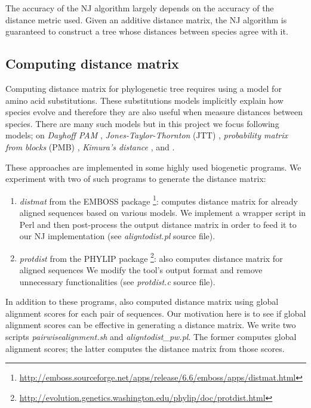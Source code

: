 \documentclass[11pt,letterpaper]{article}
\theoremstyle{definition}
\begin{document}
The accuracy of the NJ algorithm largely depends on the accuracy of the distance metric used. Given an additive distance matrix, the NJ algorithm is guaranteed to construct a tree whose distances between species agree with it. 

\subsection{Computing distance matrix}\label{distance}


Computing distance matrix for phylogenetic tree requires using a model for amino acid substitutions. These substitutions models implicitly explain how species evolve and therefore they are also useful when measure distances between species. There are many such models but in this project we focus following models; on \textit{Dayhoff PAM} \cite{kosiol2005different}, \textit{Jones-Taylor-Thornton} (JTT) \cite{jones1992rapid}, \textit{probability matrix from blocks} (PMB) \cite{veerassamy2003transition}, \textit{Kimura's distance} \cite{kimura1983rare}, and  \cite{jukes1969evolution}. 

These approaches are implemented in some highly used biogenetic programs. We experiment with two of such programs to generate the distance matrix:
\begin{enumerate}
	\item \textit{distmat} from the EMBOSS package \cite{rice2000emboss}  \footnote{\url{http://emboss.sourceforge.net/apps/release/6.6/emboss/apps/distmat.html}}: computes distance matrix for already aligned sequences based on various models. We implement a wrapper script in Perl and then post-process the output distance matrix in order to feed it to our NJ implementation (see \textit{aligntodist.pl} source file).
    \item \textit{protdist} from the PHYLIP package \footnote{\url{http://evolution.genetics.washington.edu/phylip/doc/protdist.html}}: also computes distance matrix for aligned sequences We modify the tool's output format and remove unnecessary functionalities (see \textit{protdist.c} source file).
\end{enumerate}

In addition to these programs, also computed distance matrix using global alignment scores for each pair of sequences. Our motivation here is to see if global alignment scores can be effective in generating a distance matrix. We write two scripts \textit{pairwisealignment.sh} and \textit{aligntodist\_pw.pl}. The former computes global alignment scores; the latter computes the distance matrix from those scores.
\end{document}
